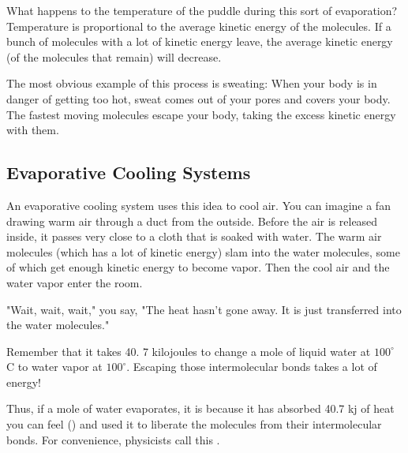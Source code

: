 What happens to the temperature of the puddle during this sort of evaporation?  Temperature is proportional to the average kinetic energy of the molecules.  If a bunch of molecules with a lot of kinetic energy leave,  the average kinetic energy (of the molecules that remain) will decrease.

The most obvious example of this process is sweating:  When your body is in danger of getting too hot,  sweat comes out of your pores and covers your body.   The fastest moving molecules escape your body,  taking the excess kinetic energy with them.

\subsection{Evaporative Cooling Systems}

An evaporative cooling system uses this idea to cool air.  You can imagine a fan drawing warm air through a duct from the outside.   Before the air is released inside,  it passes very close to a cloth that is soaked with water.   The warm air molecules (which has a lot of kinetic energy) slam into the water molecules,  some of which get enough kinetic energy to become vapor.  Then the cool air and the water vapor enter the room.

"Wait, wait, wait," you say, "The heat hasn't gone away.  It is just transferred into the water molecules."

Remember that it takes 40. 7 kilojoules to change a mole of liquid water at $100^\circ$ C to water vapor at $100^\circ$.  Escaping those intermolecular bonds takes a lot of energy!

Thus,   if a mole of water evaporates,   it is because it has absorbed 40.7 kj of heat you can feel
 () and used it to liberate the molecules from their intermolecular bonds.  For
 convenience,  physicists call this .
 
 
